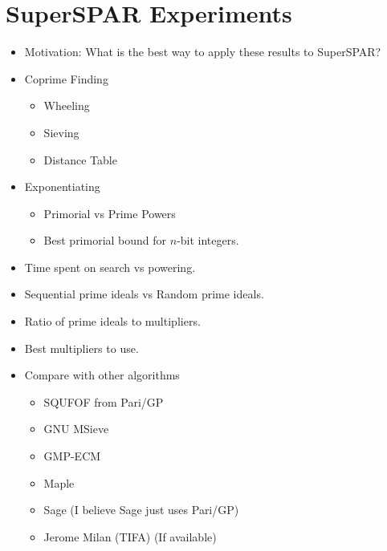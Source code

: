 \documentclass[11pt, letterpaper]{article}
\theoremstyle{definition}
\begin{document}
\bigbreak
\section{SuperSPAR Experiments}
\begin{itemize}
\item Motivation: What is the best way to apply these results to SuperSPAR?


\item Coprime Finding
	\begin{itemize}
	\item Wheeling
	\item Sieving
	\item Distance Table
	\end{itemize}

	\item Exponentiating 
	\begin{itemize}
	\item Primorial vs Prime Powers
	\item Best primorial bound for $n$-bit integers.
	\end{itemize}
	
\item Time spent on search vs powering.
\item Sequential prime ideals vs Random prime ideals.
\item Ratio of prime ideals to multipliers.
\item Best multipliers to use.

\item Compare with other algorithms
	\begin{itemize}
	\item SQUFOF from Pari/GP
	\item GNU MSieve
	\item GMP-ECM
	\item Maple
	\item Sage (I believe Sage just uses Pari/GP)
	\item Jerome Milan (TIFA) (If available)
	\end{itemize}

\end{itemize}




\bigbreak
\end{document}

